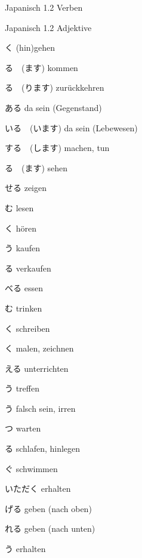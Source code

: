 \noindent
\centering
Japanisch 1.2 Verben

\begin{multicols*}{2}
\begin{flushleft}
\begin{labeling}{Japanisch 1.2 Adjektive}
	\item [\ruby{行}{い}く] (hin)gehen
	\item [\ruby{来}{く}る　(\ruby{来}{き}ます)] kommen
	\item [\ruby{帰}{かえ}る　(\ruby{帰}{かえ}ります)] zurückkehren
	
	\item [ある] da sein (Gegenstand)
	\item [いる　(います)] da sein (Lebewesen)
	\item [する　(します)] machen, tun
	
	\item [\ruby{見}{み}る　(\ruby{見}{み}ます)] sehen
	\item [\ruby{見}{み}せる] zeigen
	\item [\ruby{読}{よ}む] lesen
	\item [\ruby{聞}{き}く] hören
	
	\item [\ruby{買}{か}う] kaufen
	\item [\ruby{売}{う}る] verkaufen
	\item [\ruby{食}{た}べる] essen
	\item [\ruby{飲}{の}む] trinken
	
	\item [\ruby{書}{か}く] schreiben
	\item [\ruby{画}{か}く] malen, zeichnen
	\item [\ruby{教}{おし}える] unterrichten
	
	\item [\ruby{会}{あ}う] treffen
	\item [\ruby{違}{ちが}う] falsch sein, irren
	\item [\ruby{待}{ま}つ] warten
	\item [\ruby{寝}{ね}る] schlafen, hinlegen
	\item [\ruby{泳}{およ}ぐ] schwimmen
	
	\item [いただく] erhalten
	\item [\ruby{上}{あ}げる] geben (nach oben)
	\item [\ruby{呉}{く}れる] geben (nach unten)
	\item [\ruby{貰}{もら}う] erhalten
	

\end{labeling}
\end{flushleft}
\end{multicols*}
